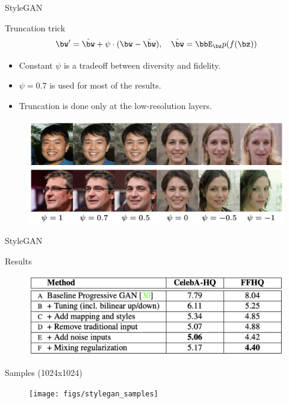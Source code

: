 \begin{frame}{StyleGAN}
	\begin{block}{Truncation trick}
		\vspace{-0.2cm}
		\[
			\bw' = \hat{\bw} + \psi \cdot (\bw - \hat{\bw}), \quad \hat{\bw} = \bbE_{\bz} p(f(\bz))
		\]
		\vspace{-0.2cm}
		\begin{itemize}
			\item Constant $\psi$ is a tradeoff between diversity and fidelity. 
			\item $\psi=0.7$ is used for most of the results.
			\item Truncation is done only at the low-resolution layers.
		\end{itemize}
		\begin{figure}
			\centering
			\includegraphics[width=0.8\linewidth]{figs/stylegan_truncation}
		\end{figure}
	\end{block}

\end{frame}
\begin{frame}{StyleGAN}
	\begin{block}{Results}
		\vspace{-0.2cm}
		\begin{figure}
			\centering
			\includegraphics[width=0.6\linewidth]{figs/stylegan_results}
		\end{figure}
	\vspace{-0.3cm}
	\end{block}
	\begin{block}{Samples (1024x1024)}
		\begin{figure}
			\centering
			\texttt{[image: figs/stylegan\_samples]}
		\end{figure}
	\vspace{-0.1cm}
	\end{block}

\end{frame}
